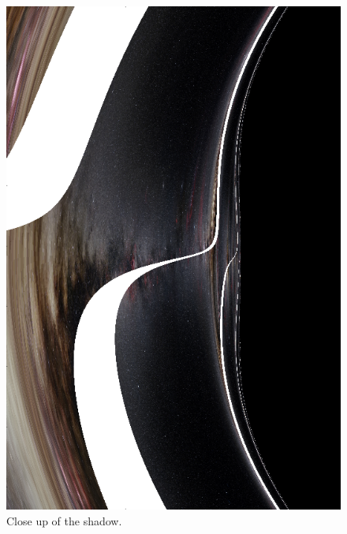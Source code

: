 \begin{figure}[bth]
	\myfloatalign
	\includegraphics[width=.\linewidth]{gfx/bh_detail_texture_disk-white}
	\caption[Close up of the shadow.]{Close up of the shadow.}
	\label{fig:detail}
\end{figure}
